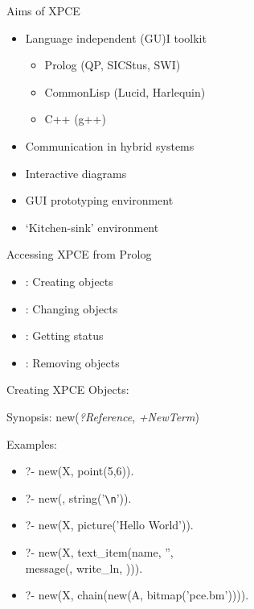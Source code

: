 \begin{sli}{Aims of XPCE}
\begin{itemize}
    \item Language independent (GU)I toolkit
    \begin{itemize}
        \item Prolog (QP, SICStus, SWI)
	\item CommonLisp (Lucid, Harlequin)
	\item C++ (g++)
    \end{itemize}
    \item Communication in hybrid systems
    \item Interactive diagrams
    \item GUI prototyping environment
    \item `Kitchen-sink' environment
\end{itemize}
\end{sli}



\begin{sli}{Accessing XPCE from Prolog}
\begin{itemize}
    \item {}: Creating objects
    \item {}: Changing objects
    \item {}: Getting status
    \item {}: Removing objects
\end{itemize}
\end{sli}


\begin{sli}{Creating XPCE Objects: }

Synopsis: new({\it ?Reference}, {\it +NewTerm})

Examples:

\begin{itemize}
    \item ?- new(X, point(5,6)).
    \item ?- new(, string('\verb$\n$')).
    \item ?- new(X, picture('Hello World')).
    \item ?- new(X, text_item(name, '', \\
			      message(, write_ln, ))).
    \item ?- new(X, chain(new(A, bitmap('pce.bm')))).
\end{itemize}
\end{sli}

